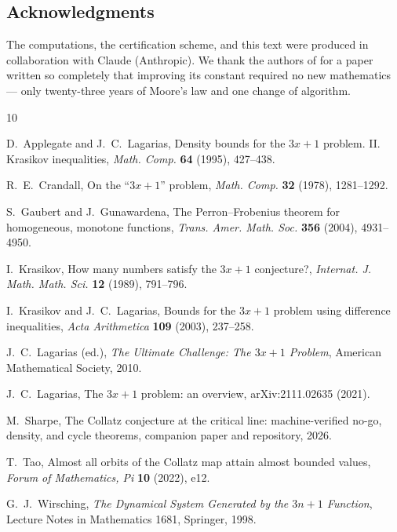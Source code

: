 \documentclass[11pt]{article}
\begin{document}
\subsection*{Acknowledgments}
The computations, the certification scheme, and this text were
produced in collaboration with Claude (Anthropic). We thank the
authors of \cite{kl} for a paper written so completely that improving
its constant required no new mathematics --- only twenty-three years
of Moore's law and one change of algorithm.

\begin{thebibliography}{10}

 D.~Applegate and J.~C.~Lagarias, Density
bounds for the $3x+1$ problem. II. Krasikov inequalities, \emph{Math.
Comp.} \textbf{64} (1995), 427--438.

 R.~E.~Crandall, On the ``$3x+1$'' problem,
\emph{Math. Comp.} \textbf{32} (1978), 1281--1292.

 S.~Gaubert and J.~Gunawardena, The
Perron--Frobenius theorem for homogeneous, monotone functions,
\emph{Trans. Amer. Math. Soc.} \textbf{356} (2004), 4931--4950.

 I.~Krasikov, How many numbers satisfy the $3x+1$
conjecture?, \emph{Internat. J. Math. Math. Sci.} \textbf{12} (1989),
791--796.

 I.~Krasikov and J.~C.~Lagarias, Bounds for the $3x+1$
problem using difference inequalities, \emph{Acta Arithmetica}
\textbf{109} (2003), 237--258.

 J.~C.~Lagarias (ed.), \emph{The Ultimate
Challenge: The $3x+1$ Problem}, American Mathematical Society, 2010.

 J.~C.~Lagarias, The $3x+1$ problem: an
overview, arXiv:2111.02635 (2021).

 M.~Sharpe, The Collatz conjecture at the critical
line: machine-verified no-go, density, and cycle theorems, companion
paper and repository, 2026.

 T.~Tao, Almost all orbits of the Collatz map attain
almost bounded values, \emph{Forum of Mathematics, Pi} \textbf{10}
(2022), e12.

 G.~J.~Wirsching, \emph{The Dynamical System
Generated by the $3n+1$ Function}, Lecture Notes in Mathematics 1681,
Springer, 1998.

\end{thebibliography}
\end{document}
